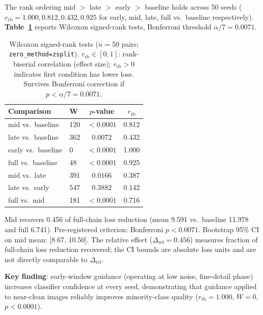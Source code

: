 \documentclass[10pt]{article}
\begin{document}
The rank ordering mid $>$ late $>$ early $>$ baseline holds across 50 seeds
($r_\mathrm{rb} = 1.000, 0.812, 0.432, 0.925$ for early, mid, late, full
vs.\ baseline respectively).  \textbf{Table~\ref{tab:wilcoxon}} reports
Wilcoxon signed-rank tests, Bonferroni threshold $\alpha/7 = 0.0071$.

\begin{table}[h]
\centering
\caption{Wilcoxon signed-rank tests ($n=50$ pairs; \texttt{zero\_method=zsplit}).
$r_\mathrm{rb} \in [0,1]$: rank-biserial correlation (effect size);
$r_\mathrm{rb} > 0$ indicates first condition has lower loss.
Survives Bonferroni correction if $p < \alpha/7 = 0.0071$.}
\label{tab:wilcoxon}
\renewcommand{\arraystretch}{1.1}
\begin{tabular}{@{}llcc@{}}
\toprule
\textbf{Comparison} & \textbf{W} & \textbf{$p$-value} & \textbf{$r_\mathrm{rb}$} \\
\midrule
mid vs.\ baseline   & 120  & $<0.0001$ & 0.812 \\
late vs.\ baseline  & 362  & $0.0072$  & 0.432 \\
early vs.\ baseline &   0  & $<0.0001$ & 1.000 \\
full vs.\ baseline  &  48  & $<0.0001$ & 0.925 \\
mid vs.\ late       & 391  & $0.0166$  & 0.387 \\
late vs.\ early     & 547  & $0.3882$  & 0.142 \\
full vs.\ mid       & 181  & $<0.0001$ & 0.716 \\
\bottomrule
\end{tabular}
\end{table}

Mid recovers 0.456 of full-chain loss reduction (mean 9.591 vs.\ baseline
11.978 and full 6.741).  Pre-registered criterion: Bonferroni $p < 0.0071$.
Bootstrap 95\% CI on mid mean: [8.67, 10.50].  The relative effect
($\Delta_\mathrm{rel} = 0.456$) measures fraction of full-chain loss
reduction recovered; the CI bounds are absolute loss units and are not
directly comparable to $\Delta_\mathrm{rel}$.

\medskip

\noindent\textbf{Key finding}: early-window guidance (operating at low noise,
fine-detail phase) increases classifier confidence at every seed, demonstrating
that guidance applied to near-clean images reliably improves minority-class
quality ($r_\mathrm{rb} = 1.000$, $W = 0$, $p < 0.0001$).

\medskip
\end{document}

